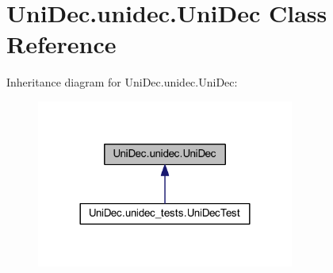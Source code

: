 \hypertarget{class_uni_dec_1_1unidec_1_1_uni_dec}{}\section{Uni\+Dec.\+unidec.\+Uni\+Dec Class Reference}
\label{class_uni_dec_1_1unidec_1_1_uni_dec}


Inheritance diagram for Uni\+Dec.\+unidec.\+Uni\+Dec\+:\nopagebreak
\begin{figure}[H]
\begin{center}
\leavevmode
\includegraphics[width=240pt]{class_uni_dec_1_1unidec_1_1_uni_dec__inherit__graph}
\end{center}
\end{figure}
